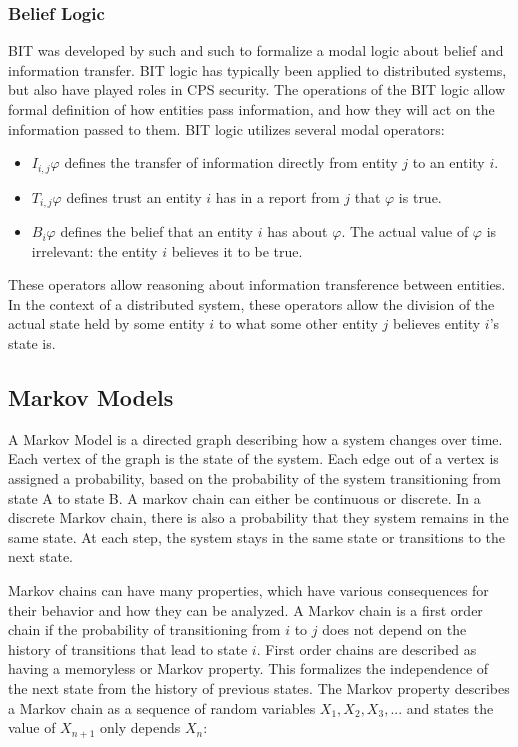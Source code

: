 \documentclass[12pt,oneside]{article}
\begin{document}
\subsubsection{Belief Logic}

BIT was developed by such and such to formalize a modal logic about belief and information transfer. BIT logic has typically been applied to distributed systems, but also have played roles in CPS security. The operations of the BIT logic allow formal definition of how entities pass information, and how they will act on the information passed to them. BIT logic utilizes several modal operators:

\begin{itemize}
\item $I_{i,j} \varphi$ defines the transfer of information directly from entity $j$ to an entity $i$. 
\item $T_{i,j} \varphi$ defines trust an entity $i$ has in a report from $j$ that $\varphi$ is true.
\item $B_i \varphi$ defines the belief that an entity $i$ has about $\varphi$. The actual value of $\varphi$ is irrelevant: the entity $i$ believes it to be true.
\end{itemize}

These operators allow reasoning about information transference between entities. In the context of a distributed system, these operators allow the division of the actual state held by some entity $i$ to what some other entity $j$ believes entity $i$'s state is.

\subsection{Markov Models}

A Markov Model is a directed graph describing how a system changes over time. Each vertex of the graph is the state of the system. Each edge out of a vertex is assigned a probability, based on the probability of the system transitioning from state A to state B. A markov chain can either be continuous or discrete. In a discrete Markov chain, there is also a probability that they system remains in the same state. At each step, the system stays in the same state or transitions to the next state.

Markov chains can have many properties, which have various consequences for their behavior and how they can be analyzed. A Markov chain is a first order chain if the probability of transitioning from $i$ to $j$ does not depend on the history of transitions that lead to state $i$.
First order chains are described as having a memoryless or Markov property.
This formalizes the independence of the next state from the history of previous states.
The Markov property describes a Markov chain as a sequence of random variables $X_{1}, X_{2}, X_{3}, ...$ and states the value of $X_{n+1}$ only depends $X_{n}$: \cite{MARKOV3}
\end{document}
